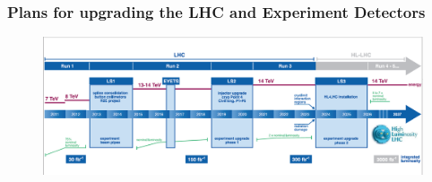 \begin{frame}
\frametitle{Plans for upgrading the LHC and Experiment Detectors}

\begin{figure}[htbp]
\begin{center}
\includegraphics[width=1.0\textwidth]{images/lhc-upgrade-timeline-detail.png}
\end{center}
\end{figure}


\end{frame}


